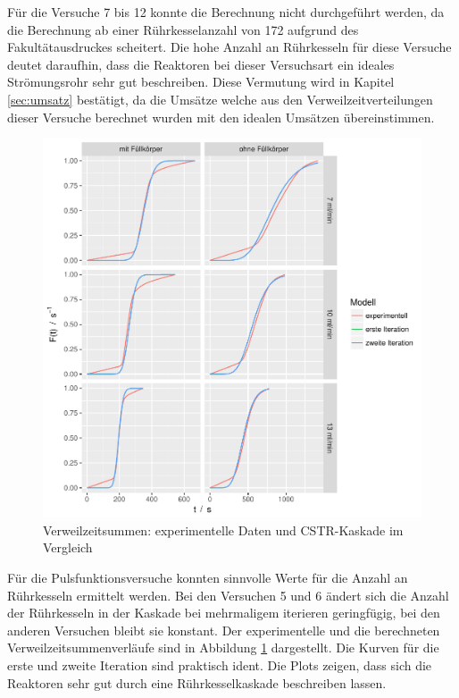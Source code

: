\documentclass[12pt,liststotoc]{report}
\begin{document}
Für die Versuche 7 bis 12 konnte die Berechnung nicht durchgeführt werden, da die Berechnung ab einer Rührkesselanzahl von 172 aufgrund des Fakultätausdruckes scheitert. Die hohe Anzahl an Rührkesseln für diese Versuche deutet daraufhin, dass die Reaktoren bei dieser Versuchsart ein ideales Strömungsrohr sehr gut beschreiben. Diese Vermutung wird in Kapitel \ref{sec:umsatz} bestätigt, da die Umsätze welche aus den Verweilzeitverteilungen dieser Versuche berechnet wurden mit den idealen Umsätzen übereinstimmen.

\begin{figure}[H]
\centering
\includegraphics[width=1\textwidth]{Graphics/kaskade.pdf}
\caption[Reaktor mit CSTR-Kaskade modelliert]{Verweilzeitsummen: experimentelle Daten und CSTR-Kaskade im Vergleich}
\label{F_kaskade}
\end{figure}
\noindent

Für die Pulsfunktionsversuche konnten sinnvolle Werte für die Anzahl an Rührkesseln ermittelt werden. Bei den Versuchen 5 und 6 ändert sich die Anzahl der Rührkesseln in der Kaskade bei mehrmaligem iterieren geringfügig, bei den anderen Versuchen bleibt sie konstant. Der experimentelle und die berechneten Verweilzeitsummenverläufe sind in Abbildung \ref{F_kaskade} dargestellt. Die Kurven für die erste und zweite Iteration sind praktisch ident. Die Plots zeigen, dass sich die Reaktoren sehr gut durch eine Rührkesselkaskade beschreiben lassen.
\end{document}
